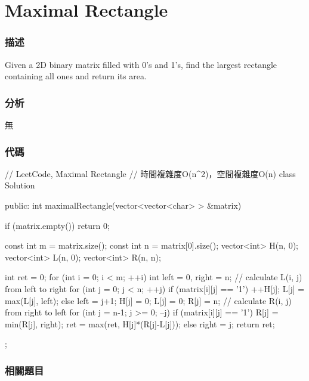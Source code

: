 \section{Maximal Rectangle} %
\label{sec:maximal-rectangle}


\subsubsection{描述}
Given a 2D binary matrix filled with 0's and 1's, find the largest rectangle containing all ones and return its area.


\subsubsection{分析}
無


\subsubsection{代碼}
\begin{Code}
// LeetCode, Maximal Rectangle
// 時間複雜度O(n^2)，空間複雜度O(n)
class Solution {
public:
    int maximalRectangle(vector<vector<char> > &matrix) {
        if (matrix.empty())  return 0;

        const int m = matrix.size();
        const int n = matrix[0].size();
        vector<int> H(n, 0);
        vector<int> L(n, 0);
        vector<int> R(n, n);

        int ret = 0;
        for (int i = 0; i < m; ++i) {
            int left = 0, right = n;
            // calculate L(i, j) from left to right
            for (int j = 0; j < n; ++j) {
                if (matrix[i][j] == '1') {
                    ++H[j];
                    L[j] = max(L[j], left);
                } else {
                    left = j+1;
                    H[j] = 0; L[j] = 0; R[j] = n;
                }
            }
            // calculate R(i, j) from right to left
            for (int j = n-1; j >= 0; --j) {
                if (matrix[i][j] == '1') {
                    R[j] = min(R[j], right);
                    ret = max(ret, H[j]*(R[j]-L[j]));
                } else {
                    right = j;
                }
            }
        }
        return ret;
    }
};
\end{Code}


\subsubsection{相關題目}

